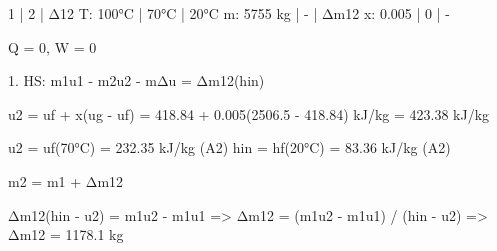1 | 2 | Δ12  
T: 100°C | 70°C | 20°C  
m: 5755 kg | - | Δm12  
x: 0.005 | 0 | -  

Q = 0, W = 0  

1. HS:  
m1u1 - m2u2 - mΔu = Δm12(hin)  

u2 = uf + x(ug - uf) = 418.84 + 0.005(2506.5 - 418.84) kJ/kg  
= 423.38 kJ/kg  

u2 = uf(70°C) = 232.35 kJ/kg (A2)  
hin = hf(20°C) = 83.36 kJ/kg (A2)  

m2 = m1 + Δm12  

Δm12(hin - u2) = m1u2 - m1u1  
=> Δm12 = (m1u2 - m1u1) / (hin - u2)  
=> Δm12 = 1178.1 kg
